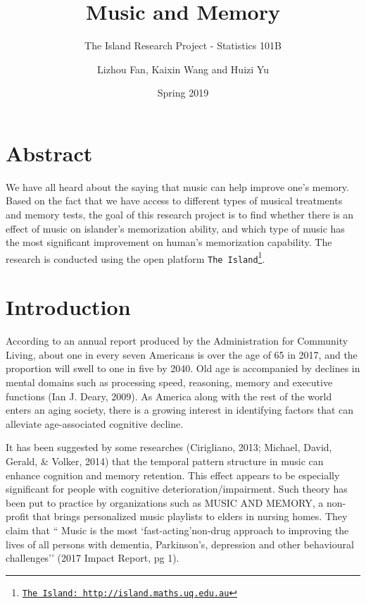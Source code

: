 \documentclass[]{article}
\title{Music and Memory}
\subtitle{The Island Research Project - Statistics 101B}
\author{Lizhou Fan, Kaixin Wang and Huizi Yu}
\date{Spring 2019}
\let\rmarkdownfootnote\footnote%
\def\footnote{\protect\rmarkdownfootnote}
\begin{document}
\maketitle

\tableofcontents
\newpage

\section{Abstract}\label{abstract}

We have all heard about the saying that music can help improve one's
memory. Based on the fact that we have access to different types of
musical treatments and memory tests, the goal of this research project
is to find whether there is an effect of music on islander's
memorization ability, and which type of music has the most significant
improvement on human's memorization capability. The research is
conducted using the open platform \texttt{The\ Island}\footnote{\href{http://island.maths.uq.edu.au}{\texttt{The\ Island:\ http://island.maths.uq.edu.au}}}.

\section{Introduction}\label{introduction}

According to an annual report produced by the Administration for
Community Living, about one in every seven Americans is over the age of
65 in 2017, and the proportion will swell to one in five by 2040. Old
age is accompanied by declines in mental domains such as processing
speed, reasoning, memory and executive functions (Ian J. Deary, 2009).
As America along with the rest of the world enters an aging society,
there is a growing interest in identifying factors that can alleviate
age-associated cognitive decline.

It has been suggested by some researches (Cirigliano, 2013; Michael,
David, Gerald, \& Volker, 2014) that the temporal pattern structure in
music can enhance cognition and memory retention. This effect appears to
be especially significant for people with cognitive
deterioration/impairment. Such theory has been put to practice by
organizations such as MUSIC AND MEMORY, a non-profit that brings
personalized music playlists to elders in nursing homes. They claim that
`` Music is the most `fast-acting'non-drug approach to improving the
lives of all persons with dementia, Parkinson's, depression and other
behavioural challenges'' (2017 Impact Report, pg 1).
\end{document}
